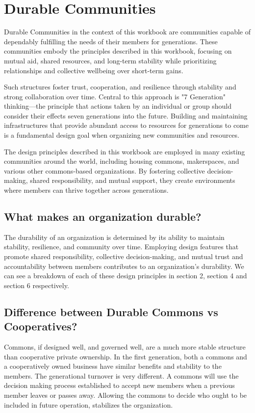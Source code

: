 	\section{Durable Communities}
\vspace{0.2cm}

Durable Communities in the context of this workbook are communities capable of dependably fulfilling the needs of their members for generations. These communities embody the principles described in this workbook, focusing on mutual aid, shared resources, and long-term stability while prioritizing relationships and collective wellbeing over short-term gains.

Such structures foster trust, cooperation, and resilience through stability and strong collaboration over time. Central to this approach is "7 Generation" thinking—the principle that actions taken by an individual or group should consider their effects seven generations into the future. Building and maintaining infrastructures that provide abundant access to resources for generations to come is a fundamental design goal when organizing new communities and resources.

The design principles described in this workbook are employed in many existing communities around the world, including housing commons, makerspaces, and various other commons-based organizations. By fostering collective decision-making, shared responsibility, and mutual support, they create environments where members can thrive together across generations.

\subsection{What makes an organization durable?} 

The durability of an organization is determined by its ability to maintain stability, resilience, and community over time. Employing design features that promote shared responsibility, collective decision-making, and mutual trust and accountability between members contributes to an organization's durability. We can see a breakdown of each of these design principles in section 2, section 4 and section 6 respectively.

\subsection{Difference between Durable Commons vs Cooperatives?}

Commons, if designed well, and governed well, are a much more stable structure than cooperative private ownership. In the first generation, both a commons and a cooperatively owned business have similar benefits and stability to the members. The generational turnover is very different. A commons will use the decision making process established to accept new members when a previous member leaves or passes away. Allowing the commons to decide who ought to be included in future operation, stabilizes the organization. 

